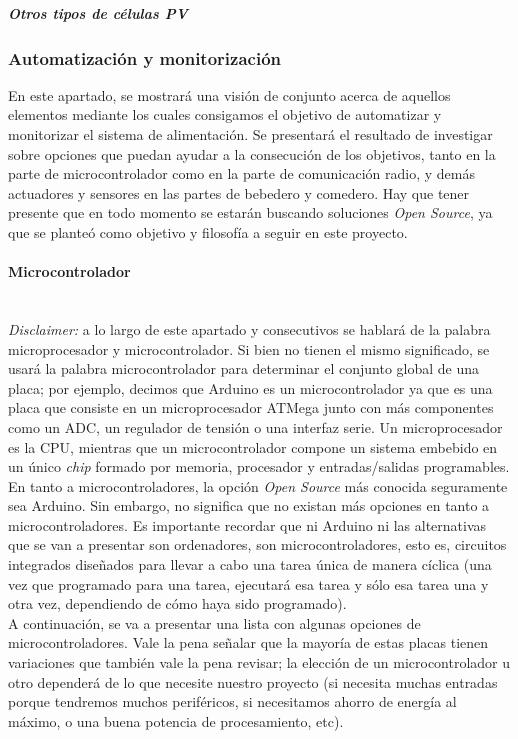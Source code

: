 \documentclass[12pt]{article}
\newcommand{\subsubsubsection}[1]{\paragraph{#1}\mbox{}\\}
\begin{document}
	\noindent \textit{\textbf{Otros tipos de células PV}} \\
	
	\subsubsection{Automatización y monitorización}
	\label{subsección 3.2.2: automatización y monitorización}
	
	\noindent En este apartado, se mostrará una visión de conjunto acerca de aquellos elementos mediante los cuales consigamos el objetivo de automatizar y monitorizar el sistema de alimentación. Se presentará el resultado de investigar sobre opciones que puedan ayudar a la consecución de los objetivos, tanto en la parte de microcontrolador como en la parte de comunicación radio, y demás actuadores y sensores en las partes de bebedero y comedero. Hay que tener presente que en todo momento se estarán buscando soluciones \textit{Open Source}, ya que se planteó como objetivo y filosofía a seguir en este proyecto.\\
	
	\subsubsubsection{Microcontrolador}
	
	\noindent \textit{Disclaimer:} a lo largo de este apartado y consecutivos se hablará de la palabra microprocesador y microcontrolador. Si bien no tienen el mismo significado, se usará la palabra microcontrolador para determinar el conjunto global de una placa; por ejemplo, decimos que Arduino es un microcontrolador ya que es una placa que consiste en un microprocesador ATMega junto con más componentes como un ADC, un regulador de tensión o una interfaz serie. Un microprocesador es la CPU, mientras que un microcontrolador compone un sistema embebido en un único \textit{chip} formado por memoria, procesador y entradas/salidas programables. \\
	
	\noindent En tanto a microcontroladores, la opción \textit{Open Source} más conocida seguramente sea Arduino. Sin embargo, no significa que no existan más opciones en tanto a microcontroladores. Es importante recordar que ni Arduino ni las alternativas que se van a presentar son ordenadores, son microcontroladores, esto es, circuitos integrados diseñados para llevar a cabo una tarea única de manera cíclica (una vez que programado para una tarea, ejecutará esa tarea y sólo esa tarea una y otra vez, dependiendo de cómo haya sido programado).\\
	
	\noindent A continuación, se va a presentar una lista con algunas opciones de microcontroladores. Vale la pena señalar que la mayoría de estas placas tienen variaciones que también vale la pena revisar; la elección de un microcontrolador u otro dependerá de lo que necesite nuestro proyecto (si necesita muchas entradas porque tendremos muchos periféricos, si necesitamos ahorro de energía al máximo, o una buena potencia de procesamiento, etc). \\
	
\end{document}
